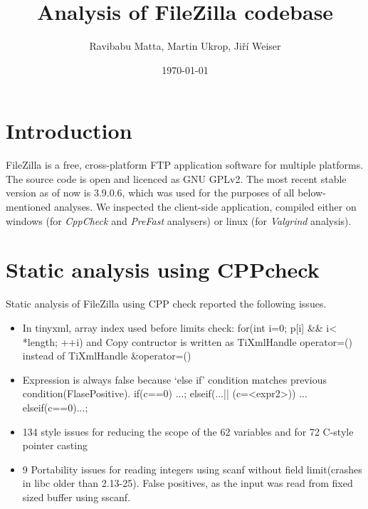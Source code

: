 \documentclass[11pt]{article}
\begin{document}
\title{Analysis of FileZilla codebase}
\date{\today}
\author{Ravibabu Matta, Martin Ukrop, Jiří Weiser}
\maketitle

\section{Introduction}

FileZilla is a free, cross-platform FTP application software for multiple platforms. The source code is open and licenced as GNU GPLv2. The most recent stable version as of now is 3.9.0.6, which was used for the purposes of all below-mentioned analyses. We inspected the client-side application, compiled either on windows (for \textit{CppCheck} and \textit{PreFast} analysers) or linux (for \textit{Valgrind} analysis).

\section{Static analysis using CPPcheck}
Static analysis of FileZilla using CPP check reported the following issues.
\begin{itemize}[topsep=0pt, itemsep=0pt]
 \item In tinyxml, array index used before limits check: for(int i=0; p[i] \&\& i< *length; ++i) and Copy contructor is written as TiXmlHandle operator=() instead of TiXmlHandle \&operator=() 
 \item Expression is always false because `else if' condition matches previous condition(FlasePositive). if(c==0) ...; elseif(...|| (c=<expr2>)) ... elseif(c==0)...; 
 \item 134 style issues for reducing the scope of the 62 variables  and for 72 C-style pointer casting 
 \item 9 Portability issues for reading integers using scanf without field limit(crashes in libc older than 2.13-25). False positives, as the input was read from fixed sized buffer using sscanf.
\end{itemize}
\end{document}
